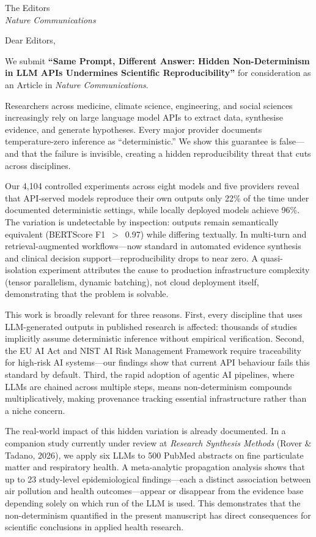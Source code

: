 \documentclass[11pt]{letter}
\begin{document}
\begin{letter}{The Editors\\
\textit{Nature Communications}}

\opening{Dear Editors,}

We submit \textbf{``Same Prompt, Different Answer: Hidden Non-Determinism in LLM APIs Undermines Scientific Reproducibility''} for consideration as an Article in \textit{Nature Communications}.

Researchers across medicine, climate science, engineering, and social sciences increasingly rely on large language model APIs to extract data, synthesise evidence, and generate hypotheses. Every major provider documents temperature-zero inference as ``deterministic.'' We show this guarantee is false---and that the failure is invisible, creating a hidden reproducibility threat that cuts across disciplines.

Our 4,104 controlled experiments across eight models and five providers reveal that API-served models reproduce their own outputs only 22\% of the time under documented deterministic settings, while locally deployed models achieve 96\%. The variation is undetectable by inspection: outputs remain semantically equivalent (BERTScore F1~$>$~0.97) while differing textually. In multi-turn and retrieval-augmented workflows---now standard in automated evidence synthesis and clinical decision support---reproducibility drops to near zero. A quasi-isolation experiment attributes the cause to production infrastructure complexity (tensor parallelism, dynamic batching), not cloud deployment itself, demonstrating that the problem is solvable.

This work is broadly relevant for three reasons. First, every discipline that uses LLM-generated outputs in published research is affected: thousands of studies implicitly assume deterministic inference without empirical verification. Second, the EU AI Act and NIST AI Risk Management Framework require traceability for high-risk AI systems---our findings show that current API behaviour fails this standard by default. Third, the rapid adoption of agentic AI pipelines, where LLMs are chained across multiple steps, means non-determinism compounds multiplicatively, making provenance tracking essential infrastructure rather than a niche concern.

The real-world impact of this hidden variation is already documented. In a companion study currently under review at \textit{Research Synthesis Methods} (Rover \& Tadano, 2026), we apply six LLMs to 500 PubMed abstracts on fine particulate matter and respiratory health. A meta-analytic propagation analysis shows that up to 23 study-level epidemiological findings---each a distinct association between air pollution and health outcomes---appear or disappear from the evidence base depending solely on which run of the LLM is used. This demonstrates that the non-determinism quantified in the present manuscript has direct consequences for scientific conclusions in applied health research.


\end{letter}
\end{document}
